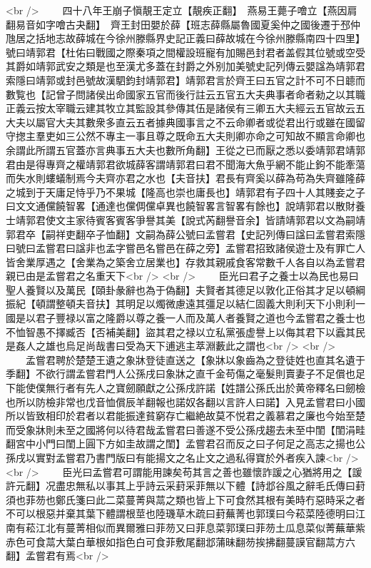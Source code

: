 <br />
　　四十八年王崩子愼靚王定立【靚疾正翻】　燕易王薨子噲立【燕因肩翻易音如字噲古夬翻】　齊王封田嬰於薛【班志薛縣屬魯國夏奚仲之國後遷于邳仲虺居之括地志故薛城在今徐州滕縣界史記正義曰薛故城在今徐州滕縣南四十四里】號曰靖郭君【杜佑曰戰國之際秦項之間權設班寵有加賜邑封君者盖假其位號或空受其爵如靖郭武安之類是也至漢尤多蓋在封爵之外别加美號史記列傳云嬰諡為靖郭君索隱曰靖郭或封邑號故漢駟鈞封靖郭君】靖郭君言於齊王曰五官之計不可不日聼而數覧也【記曾子問諸侯出命國家五官而後行註云五官五大夫典事者命者勑之以其職正義云按太宰職云建其牧立其監設其參傳其伍是諸侯有三卿五大夫經云五官故云五大夫以屬官大夫其數衆多直云五者據典國事言之不云命卿者或從君出行或雖在國留守揔主羣吏如三公然不專主一事且尊之既命五大夫則卿亦命之可知故不顯言命卿也余謂此所謂五官蓋亦言典事五大夫也數所角翻】王從之已而厭之悉以委靖郭君靖郭君由是得專齊之權靖郭君欲城薛客謂靖郭君曰君不聞海大魚乎網不能止鉤不能牽蕩而失水則螻蟻制焉今夫齊亦君之水也【夫音扶】君長有齊奚以薛為苟為失齊雖隆薛之城到于天庸足恃乎乃不果城【隆高也崇也庸長也】靖郭君有子四十人其賤妾之子曰文文通儻饒智畧【通達也儻倜儻卓異也饒智畧言智畧有餘也】說靖郭君以散財養士靖郭君使文主家待賓客賓客爭譽其美【說式芮翻譽音余】皆請靖郭君以文為嗣靖郭君卒【嗣祥吏翻卒子恤翻】文嗣為薛公號曰孟嘗君【史記列傳曰諡曰孟嘗君索隱曰號曰孟嘗君曰諡非也孟字嘗邑名嘗邑在薛之旁】孟嘗君招致諸侯遊士及有罪亡人皆舍業厚遇之【舍業為之築舍立居業也】存救其親戚食客常數千人各自以為孟嘗君親已由是孟嘗君之名重天下<br />
<br />
　　臣光曰君子之養士以為民也易曰聖人養賢以及萬民【頤卦彖辭也為于偽翻】夫賢者其德足以敦化正俗其才足以頓綱振紀【頓謂整頓夫音扶】其明足以燭微慮遠其彊足以結仁固義大則利天下小則利一國是以君子豐禄以富之隆爵以尊之養一人而及萬人者養賢之道也今孟嘗君之養士也不恤智愚不擇臧否【否補美翻】盜其君之禄以立私黨張虚譽上以侮其君下以蠧其民是姦人之雄也烏足尚哉書曰受為天下逋逃主萃淵藪此之謂也<br />
<br />
　　孟嘗君聘於楚楚王遺之象牀登徒直送之【象牀以象齒為之登徒姓也直其名遺于季翻】不欲行謂孟嘗君門人公孫戌曰象牀之直千金苟傷之毫髮則賣妻子不足償也足下能使僕無行者有先人之寶劒願獻之公孫戌許諾【姓譜公孫氏出於黄帝釋名曰劒檢也所以防檢非常也戊音恤償辰羊翻報也諾奴各翻以言許人曰諾】入見孟嘗君曰小國所以皆致相印於君者以君能振達貧窮存亡繼絶故莫不悦君之義慕君之廉也今始至楚而受象牀則未至之國將何以待君哉孟嘗君曰善遂不受公孫戌趨去未至中閨【閨涓畦翻宮中小門曰閨上圓下方如圭故謂之閨】孟嘗君召而反之曰子何足之高志之揚也公孫戌以實對孟嘗君乃書門版曰有能揚文之名止文之過私得寶於外者疾入諫<br />
<br />
　　臣光曰孟嘗君可謂能用諫矣苟其言之善也雖懷詐諼之心猶將用之【諼許元翻】况盡忠無私以事其上乎詩云采葑采菲無以下體【詩邶谷風之辭毛氏傳曰葑須也菲芴也鄭氏箋曰此二菜蔓菁與蒚之類也皆上下可食然其根有美時冇惡時采之者不可以根惡并棄其葉下體謂根莖也陸璣草木疏曰葑蕪菁也郭璞曰今菘菜陸德明曰江南有菘江北有蔓菁相似而異爾雅曰菲芴又曰菲息菜郭璞曰菲芴土瓜息菜似菁蕪華紫赤色可食蒚大葉白華根如指色白可食菲敷尾翻邶蒲昧翻芴挨拂翻蔓謨官翻蒚方六翻】孟嘗君有焉<br />
